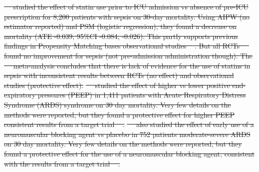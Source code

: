 \documentclass[10pt,letterpaper]{article}
\providecommand{\DIFdeltex}[1]{{\protect\color{red}\sout{#1}}}                      %
\providecommand{\DIFdelbegin}{} %
\providecommand{\DIFdel}[1]{\texorpdfstring{\DIFdeltex{#1}}{}} %
\newcommand{\DIFscaledelfig}{0.5}
\newlength{\DIFdelgraphicswidth} %
\newlength{\DIFdelgraphicsheight} %
\newcommand{\DIFdelincludegraphics}[2][]{%
\sbox{\DIFdelgraphicsbox}{\DIFOincludegraphics[#1]{#2}}%
\settoboxwidth{\DIFdelgraphicswidth}{\DIFdelgraphicsbox} %
\settoboxtotalheight{\DIFdelgraphicsheight}{\DIFdelgraphicsbox} %
\scalebox{\DIFscaledelfig}{%
\parbox[b]{\DIFdelgraphicswidth}{\usebox{\DIFdelgraphicsbox}\\[-\baselineskip] \rule{\DIFdelgraphicswidth}{0em}}\llap{\resizebox{\DIFdelgraphicswidth}{\DIFdelgraphicsheight}{%
\setlength{\unitlength}{\DIFdelgraphicswidth}%
\begin{picture}(1,1)%
\thicklines\linethickness{2pt} %
{\color[rgb]{1,0,0}\put(0,0){\framebox(1,1){}}}%
{\color[rgb]{1,0,0}\put(0,0){\line( 1,1){1}}}%
{\color[rgb]{1,0,0}\put(0,1){\line(1,-1){1}}}%
\end{picture}%
}\hspace*{3pt}}} %
} %
\DeclareRobustCommand{\DIFdelbegin}{\DIFOdelbegin \let\includegraphics\DIFdelincludegraphics} %
\begin{document}
\DIFdelbegin %
\DIFdel{\mbox{%
\cite{chinaeke2021impact} }\hskip0pt%
studied the effect of \textcolor{I}{statin use
          prior to ICU admission} vs \textcolor{C}{absence of pre-ICU
          prescription} for \textcolor{P}{8,200 patients with sepsis} on
        \textcolor{O}{30-day mortality}. Using AIPW (no estimator reported)
        and PSM (logistic regression), they found a decrease on mortality (ATE
        -0.039, 95\%CI -0.084, -0.026). This partly supports previous
        findings in Propensity Matching bases observational studies
        \mbox{%
\cite{lee2017preadmission,kyu2019preadmission}}\hskip0pt%
. But all RCTs
        \mbox{%
\cite{national2014rosuvastatin,singh2017effects} }\hskip0pt%
found no improvement for sepsis (not
        pre-admission administration though). The \mbox{%
\cite{wan2014effect}
        }\hskip0pt%
meta-analysis concludes that there is lack of evidence for the use of
        statins in sepsis with inconsistent results between RCTs (no effect)
        and observational studies (protective effect).
  }%
\DIFdel{\mbox{%
\cite{adibuzzaman2019323} }\hskip0pt%
studied the effect of \textcolor{I}{higher} vs
        \textcolor{C}{lower positive end-expiratory pressures (PEEP)} in
        \textcolor{P}{1,411 patients with Acute Respiratory Distress Syndrome
          (ARDS) syndrome} on \textcolor{O}{30 day mortality}. Very few details on
        the methods were reported, but they found a protective effect for higher PEEP
        consistent results from a target trial \mbox{%
\cite{national2004higher}}\hskip0pt%
.
  }%
\DIFdel{\mbox{%
\cite{adibuzzaman2019323} }\hskip0pt%
also studied the effect of \textcolor{I}{early
          use of a neuromuscular blocking agent } vs \textcolor{C}{placebo} in
        \textcolor{P}{752 patients moderate-severe ARDS} on \textcolor{O}{30
          day mortality}. Very few details on the methods were reported, but they found a
        protective effect for the use of a neuromuscular blocking agent,
        consistent with the results from a target trial
        \mbox{%
\cite{papazian2010neuromuscular}}\hskip0pt%
.
  }%
\end{document}
